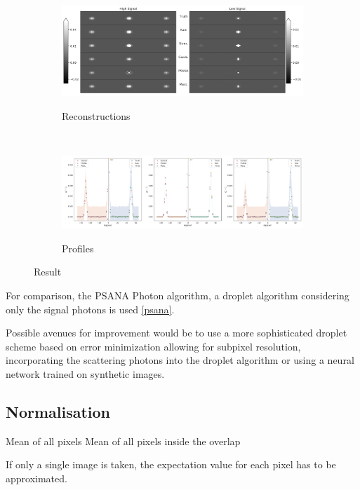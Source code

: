 \begin{figure}
	\centering
	\begin{subfigure}[b]{0.85\textwidth}
		\includegraphics[width=\linewidth]{images/photonreconimg.pdf}
		\label{fig:photonreconimg}
		\caption{Reconstructions}
	\end{subfigure}
\\
	\begin{subfigure}[b]{0.95\textwidth}
		\includegraphics[width=\linewidth]{images/photonrecon.pdf}
		\label{fig:photonrecon}
		\caption{Profiles}
	\end{subfigure}	
	
	\caption{Result} 
\end{figure}





For comparison, the PSANA Photon algorithm, a droplet algorithm considering only the signal photons is used \ref{psana}.

Possible avenues for improvement would be to use a more sophisticated droplet scheme based on error minimization allowing for subpixel resolution, incorporating the scattering photons into the droplet algorithm or using a neural network trained on synthetic images.




\subsection{Normalisation}
Mean of all pixels 
Mean of all pixels inside the overlap

If only a single image is taken, the expectation value for each pixel has to be approximated.

